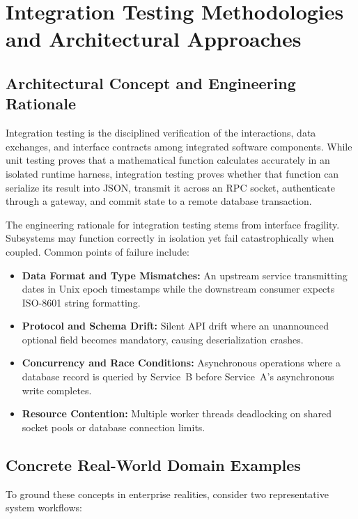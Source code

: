\documentclass[11pt,a4paper]{article}
\begin{document}
\section{Integration Testing Methodologies and Architectural Approaches}
\label{sec:integration_testing}

\subsection{Architectural Concept and Engineering Rationale}
Integration testing is the disciplined verification of the interactions, data exchanges, and interface contracts among integrated software components. While unit testing proves that a mathematical function calculates accurately in an isolated runtime harness, integration testing proves whether that function can serialize its result into JSON, transmit it across an RPC socket, authenticate through a gateway, and commit state to a remote database transaction.

The engineering rationale for integration testing stems from interface fragility. Subsystems may function correctly in isolation yet fail catastrophically when coupled. Common points of failure include:
\begin{itemize}
    \item \textbf{Data Format and Type Mismatches:} An upstream service transmitting dates in Unix epoch timestamps while the downstream consumer expects ISO-8601 string formatting.
    \item \textbf{Protocol and Schema Drift:} Silent API drift where an unannounced optional field becomes mandatory, causing deserialization crashes.
    \item \textbf{Concurrency and Race Conditions:} Asynchronous operations where a database record is queried by Service~B before Service~A's asynchronous write completes.
    \item \textbf{Resource Contention:} Multiple worker threads deadlocking on shared socket pools or database connection limits.
\end{itemize}

\subsection{Concrete Real-World Domain Examples}
To ground these concepts in enterprise realities, consider two representative system workflows:
\end{document}
